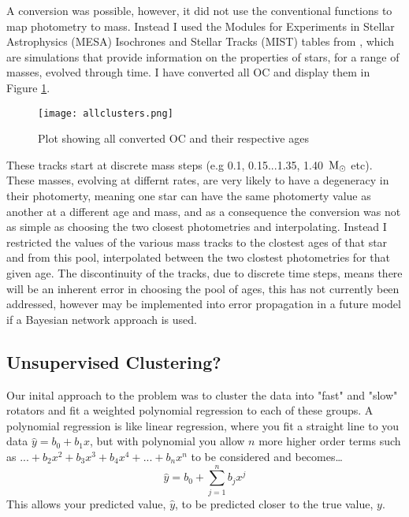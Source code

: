 \documentclass[fleqn,usenatbib]{mnras}
\begin{document}
A conversion was possible, however, it did not use the conventional functions to map photometry to mass. 
Instead I used the Modules for Experiments in Stellar Astrophysics (MESA) Isochrones and Stellar Tracks (MIST) tables from \cite{Choi_2016}, which are simulations that provide information on the properties of stars, for a range of masses, evolved through time.
I have converted all OC and display them in Figure \ref{fig:allclusters}.

\begin{figure}
	\centering
	\texttt{[image: allclusters.png]}
	\caption[]{Plot showing all converted OC and their respective ages}
	\label{fig:allclusters}
\end{figure}

These tracks start at discrete mass steps (e.g 0.1, 0.15...1.35, 1.40~$\textup{M}_\odot$ etc).
These masses, evolving at differnt rates, are very likely to have a degeneracy in their photomerty, meaning one star can have the same photomerty value as another at a different age and mass, and as a consequence the conversion was not as simple as choosing the two closest photometries and interpolating.
Instead I restricted the values of the various mass tracks to the clostest ages of that star and from this pool, interpolated between the two clostest photometries for that given age.
The discontinuity of the tracks, due to discrete time steps, means there will be an inherent error in choosing the pool of ages, this has not currently been addressed, however may be implemented into error propagation in a future model if a Bayesian network approach is used. 

\subsection{Unsupervised Clustering?}
Our inital approach to the problem was to cluster the data into "fast" and "slow" rotators and fit a weighted polynomial regression to each of these groups.
A polynomial regression is like linear regression, where you fit a straight line to you data $\hat{y} = b_0 + b_1x$, but with polynomial you allow $n$ more higher order terms such as $...+ b_2x^2 + b_3x^3+b_4x^4+...+b_nx^n $ to be considered and becomes\dots
\begin{equation}
	\label{eq:poly}
	\hat{y} = b_0 + \sum_{j = 1}^n b_jx^j
\end{equation}
This allows your predicted value, $\hat{y}$, to be predicted closer to the true value, $y$.
\end{document}
